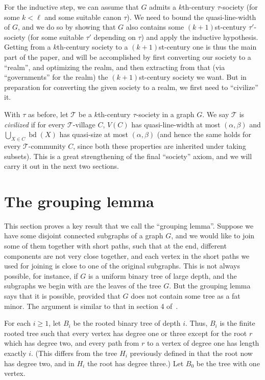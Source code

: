 \documentclass[titlepage,11pt]{article}
\newcommand{\bd}{\operatorname{bd}}
\newcommand{\mac}{\mathcal}
\begin{document}
	For the inductive step, we can assume that $G$ admits a $k$th-century $\tau$-society (for some $k<\ell$ and some suitable 
	canon $\tau$). We need to bound the quasi-line-width of $G$, and we do so by showing that $G$
	also contains some $(k+1)$st-century $\tau'$-society (for some suitable $\tau'$ depending on $\tau$)
	and apply the inductive hypothesis. Getting from a $k$th-century society to a $(k+1)$st-century one is thus the main part of the paper, 
	and will be accomplished by first converting our society to a ``realm'', and optimizing the realm, and then extracting from that 
	(via ``governments'' for the realm) the $(k+1)$st-century society we want. But in preparation for converting the given society to a 
	realm, we first need to ``civilize'' it. 
	
	With $\tau$ as before, let $\mac T$ be a $k$th-century $\tau$-society in a graph $G$. We say $\mac T$ is {\em civilized} if
	for every $\mac T$-village $C$, $V(C)$ has quasi-line-width at most $(\alpha,\beta)$ and
	$\bigcup_{X\in C}\bd (X)$ has quasi-size at most $(\alpha,\beta)$ (and hence the same holds for every $\mac T$-community $C$, since both these 
	properties are inherited under taking subsets). This is a great strengthening of the final ``society'' axiom, and we will carry it out
	in the next two sections.
	
	
	
	\section{The grouping lemma}
	
	This section proves a key result 
	that we call the ``grouping lemma''. 
	Suppose we have some disjoint connected subgraphs of a graph $G$, and we would like to join some of them together with short paths, such
	that
	at the end, different components are not very close together, and each vertex in the short paths we used for joining
	is close to one of the original subgraphs. This is not always possible, for instance, if $G$ is a uniform binary tree of large depth,
	and the subgraphs we begin with are the leaves of the tree $G$. But the grouping lemma says that it is possible, provided that
	$G$ does not contain some tree as a fat minor. The argument is similar to that in section 4 of~\cite{AS5}.
	
	For each $i \ge 1$, let $B_i$ be the rooted binary tree of depth $i$. Thus, $B_i$ is the finite rooted tree such that every vertex has degree one or three except for the root $r$ which has degree two, and
	every path from $r$ to a vertex of degree one has length exactly $i$. (This differs from the tree $H_i$ previously defined in that
	the root now has degree two, and in $H_i$ the root has degree three.) Let $B_0$ be the tree with one vertex.
	
\end{document}
